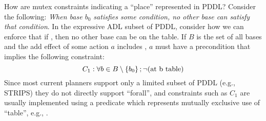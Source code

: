 

How are mutex constraints indicating a ``place'' represented in PDDL?
Consider the following: %
{\em When base $b_0$ satisfies some condition, no other base can satisfy that condition}.
In the expressive ADL subset of PDDL, consider how we can enforce that
 if , then no other base can be on the table.
If $B$ is the set of all bases and
the add effect of some action $a$ includes ,
$a$ must have a precondition that implies the following constraint:
\[
 C_1: \forall b \in B \setminus \left\{b_0\right\} ; \lnot \mbox{(at b table)}
\]
Since most current \domind planners support only a limited subset of PDDL (e.g., STRIPS)  %
they do not
directly support ``forall'', and constraints such as $C_1$ are usually
implemented using a predicate which represents mutually exclusive use
of ``table'', e.g., .
